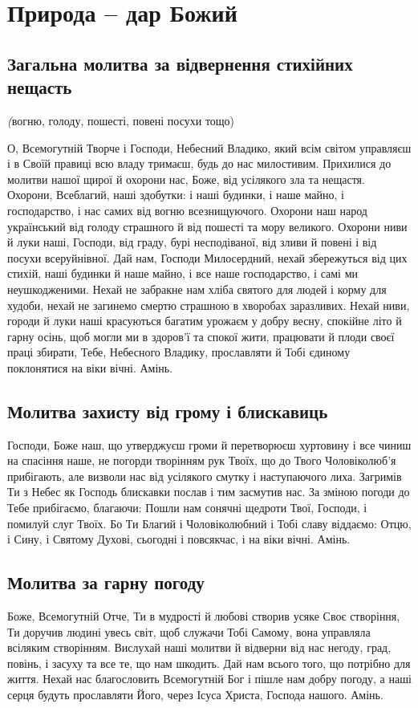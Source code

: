\documentclass[chapters.tex]{subfiles}
\begin{document}
\chapter{Природа -- дар Божий}
\section{Загальна молитва за відвернення стихійних нещасть}
\emph(вогню, голоду, пошесті, повені посухи тощо)

О, Всемогутній Творче і Господи, Небесний Владико, який всім світом управляєш і в Своїй правиці всю владу тримаєш, будь до нас милостивим. Прихилися до молитви нашої щирої й охорони нас, Боже, від усілякого зла та нещастя. Охорони, Всеблагий, наші здобутки: і наші будинки, і наше майно, і господарство, і нас самих від вогню всезнищуючого. Охорони наш народ український від голоду страшного й від пошесті та мору великого. Охорони ниви й луки наші, Господи, від граду, бурі несподіваної, від зливи й повені і від посухи всеруйнівної. Дай нам, Господи Милосердний, нехай збережуться від цих стихій, наші будинки й наше майно, і все наше господарство, і самі ми неушкодженими. Нехай не забракне нам хліба святого для людей і корму для худоби, нехай не загинемо смертю страшною в хворобах заразливих. Нехай ниви, городи й луки наші красуються багатим урожаєм у добру весну, спокійне літо й гарну осінь, щоб могли ми в здоров’ї та спокої жити, працювати й плоди своєї праці збирати, Тебе, Небесного Владику, прославляти й Тобі єдиному поклонятися на віки вічні. Амінь.

\section{Молитва захисту від грому і блискавиць}
Господи, Боже наш, що утверджуєш громи й перетворюєш хуртовину і все чиниш на спасіння наше, не погорди творінням рук Твоїх, що до Твого Чоловіколюб’я прибігають, але визволи нас від усілякого смутку і наступаючого лиха. Загримів Ти з Небес як Господь блискавки послав і тим засмутив нас. За зміною погоди до Тебе прибігаємо, благаючи: Пошли нам сонячні щедроти Твої, Господи, і помилуй слуг Твоїх. Бо Ти Благий і Чоловіколюбний і Тобі славу віддаємо: Отцю, і Сину, і Святому Духові, сьогодні і повсякчас, і на віки вічні. Амінь.

\section{Молитва за гарну погоду}
Боже, Всемогутній Отче, Ти в мудрості й любові створив усяке Своє створіння, Ти доручив людині увесь світ, щоб служачи Тобі Самому, вона управляла всіляким створінням. Вислухай наші молитви й відверни від нас негоду, град, повінь, і засуху та все те, що нам шкодить. Дай нам всього того, що потрібно для життя. Нехай нас благословить Всемогутній Бог і пішле нам добру погоду, а наші серця будуть прославляти Його, через Ісуса Христа, Господа нашого. Амінь.
\end{document}
